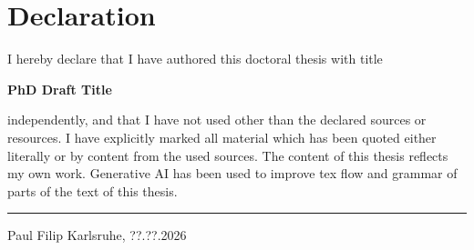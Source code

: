 
\chapter*{Declaration}


\noindent \begin{flushleft}
I hereby declare that I have authored this doctoral thesis with title 
\par\end{flushleft}

\begin{center}
\textbf{PhD Draft Title}\\
\par\end{center}
independently, and that I have not used other than the declared sources or resources. I have explicitly marked all material 
which has been quoted either literally or by content from the used sources. The content of this thesis reflects my own work. 
Generative AI has been used to improve tex flow and grammar of parts of the text of this thesis.


\vspace*{2cm}
\begin{minipage}[t]{0.4\columnwidth}%
\rule[0.5ex]{1\columnwidth}{1pt}

Paul Filip \hfill Karlsruhe, ??.??.2026
\end{minipage}

\vfill
\doclicenseThis
